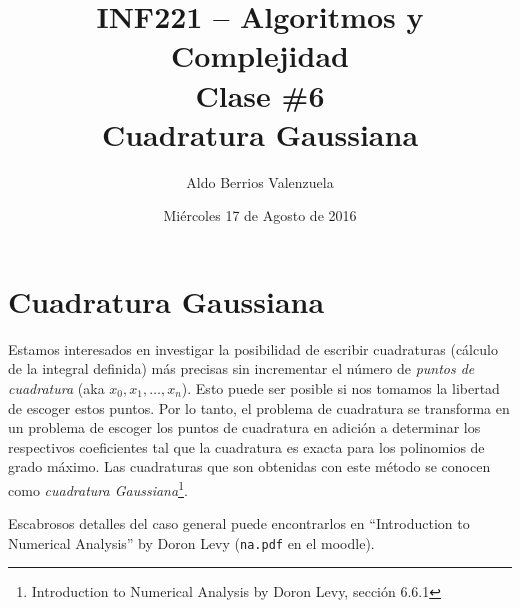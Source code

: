 \documentclass[english, spanish, fleqn, 10pt]{article}
\author{Aldo Berrios Valenzuela}
\title{INF221 -- Algoritmos y Complejidad\\[.4\baselineskip]Clase \#6\\Cuadratura Gaussiana}
\date{Miércoles 17 de Agosto de 2016}
\newcommand{\comillas}[1]{``#1''}
\numberwithin{equation}{section}
\newcommand{\nparentesis}[1]{\left( #1 \right)}
\theoremstyle{definition}
\begin{document}
\maketitle
\section{Cuadratura Gaussiana}
Estamos interesados en investigar la posibilidad de escribir cuadraturas (cálculo de la integral definida) más precisas sin incrementar el número de \textit{puntos de cuadratura} (aka $x_0, x_1, \ldots, x_n$). Esto puede ser posible si nos tomamos la libertad de escoger estos puntos. Por lo tanto, el problema de cuadratura se transforma en un problema de escoger los puntos de cuadratura en adición a determinar los respectivos coeficientes tal que la cuadratura es exacta para los polinomios de grado máximo. Las cuadraturas que son obtenidas con este método se conocen como \emph{cuadratura Gaussiana}\footnote{Introduction to Numerical Analysis by Doron Levy, sección 6.6.1}.


Escabrosos detalles del caso general puede encontrarlos en \comillas{Introduction to Numerical Analysis} by Doron Levy (\texttt{na.pdf} en el moodle).
\end{document}
